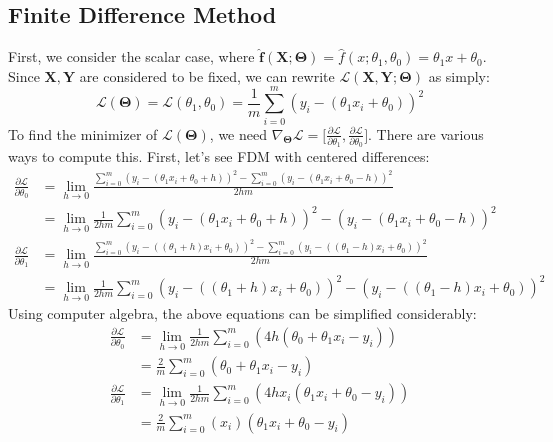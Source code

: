 \documentclass[12pt,initial,twoside,maitrise]{dms}
\numberwithin{equation}{section}
\numberwithin{table}{chapter}
\numberwithin{figure}{chapter}
\begin{document}
\subsection{Finite Difference Method}

First, we consider the scalar case, where $\mathbf{\hat f}(\mathbf{X}; \mathbf{\Theta}) = \hat f(x; \theta_1, \theta_0) = \theta_1 x + \theta_0$. Since $\mathbf{X}, \mathbf{Y}$ are considered to be fixed, we can rewrite $\mathcal{L}(\mathbf{X}, \mathbf{Y}; \mathbf{\Theta})$ as simply:
%
\begin{equation}
\mathcal{L}(\mathbf{\Theta}) = \mathcal{L}(\theta_1, \theta_0) = \frac{1}{m}\sum_{i=0}^m(y_i - (\theta_1 x_i + \theta_0))^2
\end{equation}
%
To find the minimizer of $\mathcal{L}(\mathbf{\Theta})$, we need $\nabla_\mathbf{\Theta}\mathcal{L} = \lbrack \frac{\partial\mathcal{L}}{\partial \theta_1}, \frac{\partial\mathcal{L}}{\partial \theta_0}\rbrack$. There are various ways to compute this. First, let's see FDM with centered differences:
%
\begin{align}
\frac{\partial\mathcal{L}}{\partial \theta_0} & = \underset{h \rightarrow 0}{\operatorname{lim}} \frac{\sum_{i=0}^m\left(y_i - \left(\theta_1 x_i + \theta_0 + h\right)\right)^2 - \sum_{i=0}^m\left(y_i - \left(\theta_1 x_i + \theta_0 - h\right)\right)^2}{2hm} \\ & = \underset{h \rightarrow 0}{\operatorname{lim}} \frac{1}{2hm}\sum_{i=0}^m\left(y_i - \left(\theta_1 x_i + \theta_0 + h\right)\right)^2 - \left(y_i - \left(\theta_1 x_i + \theta_0 - h\right)\right)^2 \\
\frac{\partial\mathcal{L}}{\partial \theta_1} & = \underset{h \rightarrow 0}{\operatorname{lim}} \frac{\sum_{i=0}^m\left(y_i - \left((\theta_1 + h) x_i + \theta_0\right)\right)^2 - \sum_{i=0}^m\left(y_i - \left(\left(\theta_1 - h\right) x_i + \theta_0\right)\right)^2}{2hm} \\ & = \underset{h \rightarrow 0}{\operatorname{lim}} \frac{1}{2hm}\sum_{i=0}^m\left(y_i - \left(\left(\theta_1 + h\right) x_i + \theta_0\right)\right)^2 - \left(y_i - \left(\left(\theta_1 - h\right) x_i + \theta_0\right)\right)^2
\end{align}
%
Using computer algebra, the above equations can be simplified considerably:
%
\begin{align}
\frac{\partial\mathcal{L}}{\partial \theta_0} & = \underset{h \rightarrow 0}{\operatorname{lim}} \frac{1}{2hm}\sum_{i=0}^m\left(4h ( \theta_0 +  \theta_1 x_i - y_i)\right) \label{eq:dL_dtheta0} \\
& = \boxed{\frac{2}{m}\sum_{i=0}^m\left(\theta_0 + \theta_1 x_i - y_i\right)} \\
\frac{\partial\mathcal{L}}{\partial \theta_1} & = \underset{h \rightarrow 0}{\operatorname{lim}} \frac{1}{2hm}\sum_{i=0}^m\left(4hx_i (\theta_1 x_i + \theta_0 - y_i)\right) \label{eq:dL_dtheta1} \\
& = \boxed{\frac{2}{m}\sum_{i=0}^m(x_i)(\theta_1 x_i + \theta_0 - y_i)}
\end{align}
\end{document}
